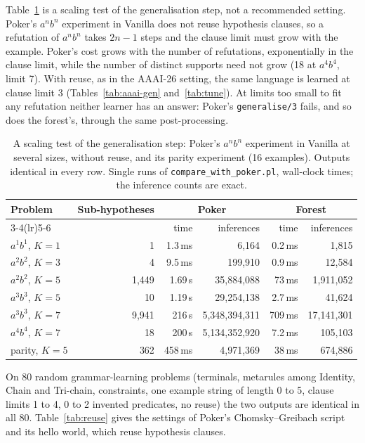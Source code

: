 \documentclass[11pt]{article}
\begin{document}
Table~\ref{tab:scaling} is a scaling test of the generalisation step, not a
recommended setting. Poker's $a^nb^n$ experiment in Vanilla does not reuse
hypothesis clauses, so a refutation of $a^nb^n$ takes $2n - 1$ steps and the clause
limit must grow with the example. Poker's cost grows with the number of
refutations, exponentially in the clause limit, while the number of distinct
supports need not grow (18 at $a^4b^4$, limit 7). With reuse, as in the AAAI-26
setting, the same language is learned at clause limit 3
(Tables~\ref{tab:aaai-gen} and~\ref{tab:tune}). At limits too small to fit any
refutation neither learner has an answer: Poker's \nolinkurl{generalise/3} fails, and
so does the forest's, through the same post-processing.

\begin{table}[ht]
\centering
\small
\begin{tabular}{lrrrrr}
\toprule
Problem & Sub-hypotheses & \multicolumn{2}{c}{Poker} & \multicolumn{2}{c}{Forest}\\
\cmidrule(lr){3-4}\cmidrule(lr){5-6}
        &               & time & inferences & time & inferences\\
\midrule
$a^1b^1$, $K=1$ & 1     & 1.3\,ms  & 6,164          & 0.2\,ms  & 1,815\\
$a^2b^2$, $K=3$ & 4     & 9.5\,ms  & 199,910        & 0.9\,ms  & 12,584\\
$a^2b^2$, $K=5$ & 1,449 & 1.69\,s  & 35,884,088     & 73\,ms   & 1,911,052\\
$a^3b^3$, $K=5$ & 10    & 1.19\,s  & 29,254,138     & 2.7\,ms  & 41,624\\
$a^3b^3$, $K=7$ & 9,941 & 216\,s   & 5,348,394,311  & 709\,ms  & 17,141,301\\
$a^4b^4$, $K=7$ & 18    & 200\,s   & 5,134,352,920  & 7.2\,ms  & 105,103\\
parity, $K=5$   & 362   & 458\,ms  & 4,971,369      & 38\,ms   & 674,886\\
\bottomrule
\end{tabular}
\caption{A scaling test of the generalisation step: Poker's $a^nb^n$ experiment in
Vanilla at several sizes, without reuse, and its parity experiment (16 examples).
Outputs identical in every row. Single runs of \nolinkurl{compare_with_poker.pl},
wall-clock times; the inference counts are exact.}
\label{tab:scaling}
\end{table}

On 80 random grammar-learning problems (terminals, metarules among Identity, Chain
and Tri-chain, constraints, one example string of length 0 to 5, clause limits 1 to
4, 0 to 2 invented predicates, no reuse) the two outputs are identical in all 80.
Table~\ref{tab:reuse} gives the settings of Poker's Chomsky--Greibach script and its
hello world, which reuse hypothesis clauses.
\end{document}
